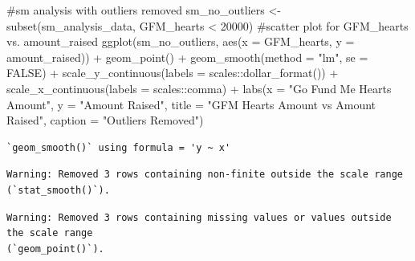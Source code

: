 \documentclass[
  letterpaper,
  DIV=11,
  numbers=noendperiod]{scrartcl}
\newenvironment{Shaded}{\begin{snugshade}}{\end{snugshade}}
\newcommand{\AttributeTok}[1]{\textcolor[rgb]{0.40,0.45,0.13}{#1}}
\newcommand{\CommentTok}[1]{\textcolor[rgb]{0.37,0.37,0.37}{#1}}
\newcommand{\ConstantTok}[1]{\textcolor[rgb]{0.56,0.35,0.01}{#1}}
\newcommand{\DecValTok}[1]{\textcolor[rgb]{0.68,0.00,0.00}{#1}}
\newcommand{\FunctionTok}[1]{\textcolor[rgb]{0.28,0.35,0.67}{#1}}
\newcommand{\NormalTok}[1]{\textcolor[rgb]{0.00,0.23,0.31}{#1}}
\newcommand{\OtherTok}[1]{\textcolor[rgb]{0.00,0.23,0.31}{#1}}
\newcommand{\SpecialCharTok}[1]{\textcolor[rgb]{0.37,0.37,0.37}{#1}}
\newcommand{\StringTok}[1]{\textcolor[rgb]{0.13,0.47,0.30}{#1}}
\begin{document}
\begin{Shaded}
\begin{Highlighting}[]
\CommentTok{\#sm analysis with outliers removed }
\NormalTok{sm\_no\_outliers }\OtherTok{\textless{}{-}} \FunctionTok{subset}\NormalTok{(sm\_analysis\_data, GFM\_hearts }\SpecialCharTok{\textless{}} \DecValTok{20000}\NormalTok{) }
\CommentTok{\#scatter plot for GFM\_hearts vs. amount\_raised }
\FunctionTok{ggplot}\NormalTok{(sm\_no\_outliers, }\FunctionTok{aes}\NormalTok{(}\AttributeTok{x =}\NormalTok{ GFM\_hearts, }\AttributeTok{y =}\NormalTok{ amount\_raised)) }\SpecialCharTok{+}
  \FunctionTok{geom\_point}\NormalTok{() }\SpecialCharTok{+}
  \FunctionTok{geom\_smooth}\NormalTok{(}\AttributeTok{method =} \StringTok{"lm"}\NormalTok{, }\AttributeTok{se =} \ConstantTok{FALSE}\NormalTok{) }\SpecialCharTok{+}
  \FunctionTok{scale\_y\_continuous}\NormalTok{(}\AttributeTok{labels =}\NormalTok{ scales}\SpecialCharTok{::}\FunctionTok{dollar\_format}\NormalTok{()) }\SpecialCharTok{+}
  \FunctionTok{scale\_x\_continuous}\NormalTok{(}\AttributeTok{labels =}\NormalTok{ scales}\SpecialCharTok{::}\NormalTok{comma) }\SpecialCharTok{+}
  \FunctionTok{labs}\NormalTok{(}\AttributeTok{x =} \StringTok{"Go Fund Me Hearts Amount"}\NormalTok{, }\AttributeTok{y =} \StringTok{"Amount Raised"}\NormalTok{, }\AttributeTok{title =} \StringTok{"GFM Hearts Amount vs Amount Raised"}\NormalTok{, }\AttributeTok{caption =} \StringTok{"Outliers Removed"}\NormalTok{)}
\end{Highlighting}
\end{Shaded}

\begin{verbatim}
`geom_smooth()` using formula = 'y ~ x'
\end{verbatim}

\begin{verbatim}
Warning: Removed 3 rows containing non-finite outside the scale range
(`stat_smooth()`).
\end{verbatim}

\begin{verbatim}
Warning: Removed 3 rows containing missing values or values outside the scale range
(`geom_point()`).
\end{verbatim}
\end{document}
